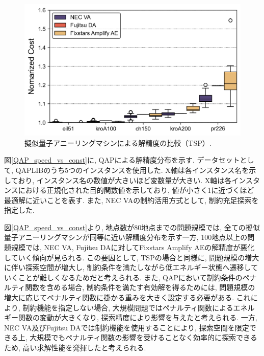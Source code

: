 \documentclass[submit,techrep,noauthor]{ipsj}
\begin{document}

\begin{figure}[hb]
\centering
\includegraphics[bb=0 0 700 230, width=15cm]{speed_vs_constraint_TSP.png}
\caption{擬似量子アニーリングマシンによる解精度の比較（TSP）.}
\label{TSP_speed_vs_const}
\end{figure}

図\ref{QAP_speed_vs_const}に, QAPによる解精度分布を示す. データセットとして, QAPLIB\cite{qaplib}のうち5つのインスタンスを使用した. X軸は各インスタンス名を示しており, インスタンス名の数値が大きいほど変数量が大きい. X軸は各インスタンスにおける正規化された目的関数値を示しており, 値が小さく1に近づくほど最適解に近いことを表す. また, NEC VAの制約活用方式として, 制約充足探索を指定した. 

図\ref{QAP_speed_vs_const}より, 地点数が80地点までの問題規模では, 全ての擬似量子アニーリングマシンが同等に近い解精度分布を示す一方, 100地点以上の問題規模では, NEC VA, Fujitsu DAに対してFixstars Amplify AEの解精度が悪化していく傾向が見られる. この要因として, TSPの場合と同様に, 問題規模の増大に伴い探索空間が増大し, 制約条件を満たしながら低エネルギー状態へ遷移していくことが難しくなるためだと考えられる. また, QAPにおいて制約条件のペナルティ関数を含める場合, 制約条件を満たす有効解を得るためには, 問題規模の増大に応じてペナルティ関数に掛かる重みを大きく設定する必要がある\cite{qaplib}. 
これにより, 制約機能を指定しない場合, 大規模問題ではペナルティ関数によるエネルギー関数の変動が大きくなり, 探索精度により影響を与えたと考えられる. 一方, NEC VA及びFujitsu DAでは制約機能を使用することにより, 探索空間を限定できる上, 大規模でもペナルティ関数の影響を受けることなく効率的に探索できるため, 高い求解性能を発揮したと考えられる. 
\end{document}

